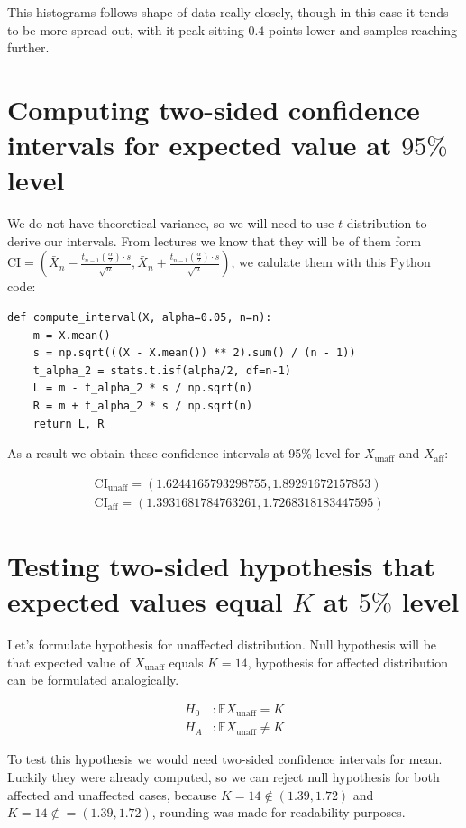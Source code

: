 \documentclass[12pt,a4paper]{article} %
\newcommand{\randv}[2][X]{#1_{\text{#2}}}
\newcommand{\E}{\mathbb{E}}
\begin{document}
This histograms follows shape of data really closely, though in this case it tends to be more spread out, with it peak sitting $0.4$ points lower and samples reaching further.

\section{Computing two-sided confidence intervals for expected value at $95\%$ level}

We do not have theoretical variance, so we will need to use $t$ distribution to derive our intervals. From lectures we know that they will be of them form $\text{CI} = \left(\bar{X}_n - \frac{t_{n-1}\left(\frac{\alpha}{2}\right) \cdot s}{\sqrt{n}}, \bar{X}_n + \frac{t_{n-1}\left(\frac{\alpha}{2}\right) \cdot s}{\sqrt{n}}\right)$, we calulate them with this Python code:

\begin{lstlisting}
def compute_interval(X, alpha=0.05, n=n):
    m = X.mean()
    s = np.sqrt(((X - X.mean()) ** 2).sum() / (n - 1))
    t_alpha_2 = stats.t.isf(alpha/2, df=n-1)
    L = m - t_alpha_2 * s / np.sqrt(n)
    R = m + t_alpha_2 * s / np.sqrt(n)
    return L, R
\end{lstlisting}

As a result we obtain these confidence intervals at 95\% level for $\randv{unaff}$ and $\randv{aff}$:

\begin{align*}
  &\text{CI}_{\text{unaff}} = (1.6244165793298755, 1.89291672157853) \\
  &\text{CI}_{\text{aff}} = (1.3931681784763261, 1.7268318183447595)
\end{align*}

\section{Testing two-sided hypothesis that expected values equal $K$ at $5\%$ level}

Let's formulate hypothesis for unaffected distribution. Null hypothesis will be that expected value of $\randv{unaff}$ equals $K = 14$, hypothesis for affected distribution can be formulated analogically.

\begin{align*}
  H_0 &: \E\randv{unaff} = K \\
  H_A &: \E\randv{unaff} \neq K
\end{align*}

To test this hypothesis we would need two-sided confidence intervals for mean. Luckily they were already computed, so we can reject null hypothesis for both affected and unaffected cases, because $K = 14 \not\in (1.39, 1.72)$ and $K = 14 \not\in = (1.39, 1.72)$, rounding was made for readability purposes.
\end{document}
